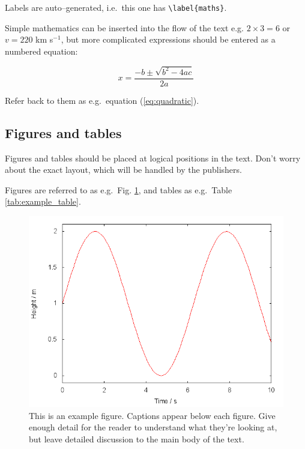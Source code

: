 \documentclass[a4paper,fleqn,usenatbib]{mnras}
\begin{document}
Labels are auto--generated, i.e.~this one has
\texttt{\textbackslash{}label\{maths\}}.

Simple mathematics can be inserted into the flow of the text e.g.
\(2\times3=6\) or \(v=220\) km s\(^{-1}\), but more complicated
expressions should be entered as a numbered equation:

\begin{equation}
  x=\frac{-b\pm\sqrt{b^2-4ac}}{2a}
  \label{eq:quadratic}
\end{equation}

Refer back to them as e.g.~equation (\ref{eq:quadratic}).

\hypertarget{figures-and-tables}{%
\subsection{Figures and tables}\label{figures-and-tables}}

Figures and tables should be placed at logical positions in the text.
Don't worry about the exact layout, which will be handled by the
publishers.

Figures are referred to as e.g.~Fig. \ref{fig:example_figure}, and
tables as e.g.~Table \ref{tab:example_table}.

\begin{figure}
  \includegraphics[width=\columnwidth]{example}
    \caption{This is an example figure. Captions appear below each figure.
  Give enough detail for the reader to understand what they're looking at,
  but leave detailed discussion to the main body of the text.}
    \label{fig:example_figure}
\end{figure}
\end{document}
